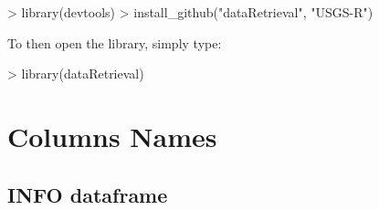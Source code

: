 \documentclass[a4paper,11pt]{article}
\begin{document}
\begin{Schunk}
\begin{Sinput}
> library(devtools)
> install_github("dataRetrieval", "USGS-R")
\end{Sinput}
\end{Schunk}
To then open the library, simply type:

\begin{Schunk}
\begin{Sinput}
> library(dataRetrieval)
\end{Sinput}
\end{Schunk}

\section{Columns Names}
\label{sec:appendix2}

\subsection{INFO dataframe}
\label{sec:appendix2INFO}
\end{document}
